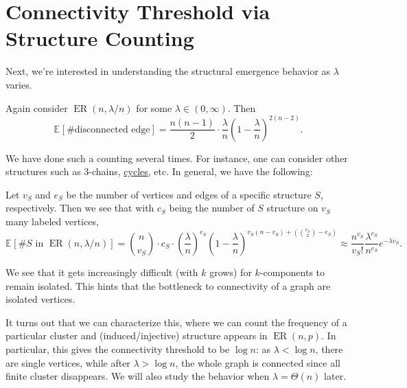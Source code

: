\section{Connectivity Threshold via Structure Counting}
Next, we're interested in understanding the structural emergence behavior as \(\lambda \) varies.

\begin{eg}
	Again consider \(\operatorname{ER}(n, \lambda / n) \) for some \(\lambda \in (0, \infty )\). Then
	\[
		\mathbb{E}_{}[\text{\#disconnected edge} ]
		= \frac{n(n-1)}{2} \cdot \frac{\lambda}{n} \left( 1 - \frac{\lambda}{n} \right) ^{2 (n-2)}.
	\]
\end{eg}

We have done such a counting several times. For instance, one can consider other structures such as \(3\)-chains, \hyperref[def:cycle]{cycles}, etc. In general, we have the following:

\begin{eg}
	Let \(v_S\) and \(e_S\) be the number of vertices and edges of a specific structure \(S\), respectively. Then we see that with \(c_S\) being the number of \(S\) structure on \(v_S\) many labeled vertices,
	\[
		\mathbb{E}_{}[\# S \text{ in } \operatorname{ER}(n, \lambda / n) ]
		= \binom{n}{v_S} \cdot c_S \cdot \left( \frac{\lambda}{n} \right) ^{e_S} \left( 1 - \frac{\lambda}{n} \right) ^{v_S (n - v_S) + (\binom{v_S}{2} - e_S)}
		\approx \frac{n^{v_S}}{v_S!} \frac{\lambda ^{e_S}}{n^{e_S} } e^{-\lambda v_S}.
	\]
\end{eg}

\begin{intuition}
	We see that it gets increasingly difficult (with \(k\) grows) for \(k\)-components to remain isolated. This hints that the bottleneck to connectivity of a graph are isolated vertices.
\end{intuition}

It turns out that we can characterize this, where we can count the frequency of a particular cluster and (induced/injective) structure appears in \(\operatorname{ER}(n, p) \). In particular, this gives the connectivity threshold to be \(\log n\): as \(\lambda < \log n\), there are single vertices, while after \(\lambda > \log n\), the whole graph is connected since all finite cluster disappears. We will also study the behavior when \(\lambda = \Theta (n)\) later.